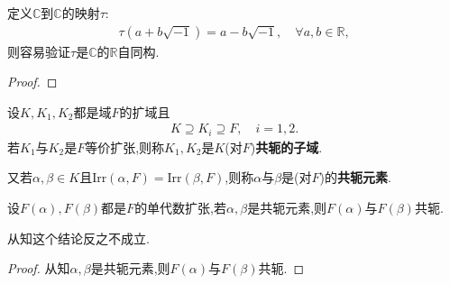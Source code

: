 \documentclass[../../main.tex]{subfiles}%
\begin{document}
\begin{example}
定义$\mathbb{C}$到$\mathbb{C}$的映射$\tau$:
\begin{align*}
\tau(a+b\sqrt{-1})=a-b\sqrt{-1},\quad \forall a,b\in\mathbb{R},
\end{align*}
则容易验证$\tau$是$\mathbb{C}$的$\mathbb{R}$自同构.
\end{example}
\begin{proof}



\end{proof}

\begin{definition}
设$K,K_1,K_2$都是域$F$的扩域且
\begin{align*}
K\supseteq K_i\supseteq F,\quad i=1,2.
\end{align*}
若$K_1$与$K_2$是$F$等价扩张,则称$K_1,K_2$是$K$(对$F$)\textbf{共轭的子域}.

又若$\alpha,\beta\in K$且$\mathrm{Irr}(\alpha,F)=\mathrm{Irr}(\beta,F)$,则称$\alpha$与$\beta$是(对$F$)的\textbf{共轭元素}.
\end{definition}

\begin{proposition}
设$F(\alpha),F(\beta)$都是$F$的单代数扩张,若$\alpha,\beta$是共轭元素,则$F(\alpha)$与$F(\beta)$共轭.
\end{proposition}
\begin{remark}
从知这个结论反之不成立.
\end{remark}
\begin{proof}

从知$\alpha,\beta$是共轭元素,则$F(\alpha)$与$F(\beta)$共轭.

\end{proof}
\end{document}
